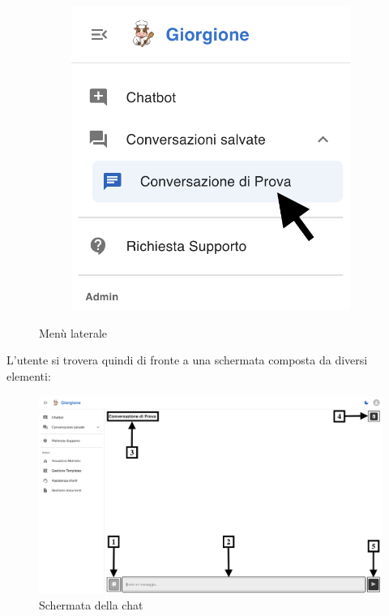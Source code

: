 \begin{figure}[h!]
\begin{subfigure}{0.3\textwidth}
        \includegraphics[width=\textwidth]{./img/laterale2.png}
    \end{subfigure}
    \caption{Menù laterale}
\end{figure}
L'utente si trovera quindi di fronte a una schermata composta da diversi elementi:
\begin{figure}[h!]
    \centering
    \includegraphics[width=\textwidth]{./img/SchermataChat1.png}
    \caption{Schermata della chat}
    \label{fig:schermata-chat}
\end{figure}
\newpage
